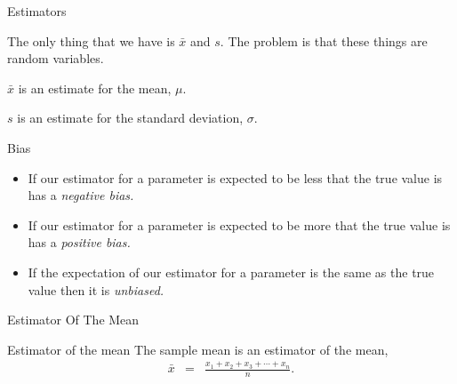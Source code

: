 \begin{frame}{Estimators}

  The only thing that we have is $\bar{x}$ and $s$. The problem is
  that these things are random variables.

  $\bar{x}$ is an estimate for the mean, $\mu$.

  $s$ is an estimate for the standard deviation, $\sigma$.

  \begin{definition}{Bias}
    \begin{itemize}
    \item If our estimator for a parameter is expected to be less that
      the true value is has a \textit{negative bias.}
    \item If our estimator for a parameter is expected to be more that
      the true value is has a \textit{positive bias.}
    \item If the expectation of our estimator for a parameter is the
      same as the true value then it is \textit{unbiased.}
    \end{itemize}
  \end{definition}
  
  \vfill

\end{frame}

\begin{frame}{Estimator Of The Mean}

  \begin{definition}{Estimator of the mean}
    The sample mean is an estimator of the mean,
  \begin{eqnarray*}
    \bar{x} & = & \frac{x_1 + x_2 + x_3 + \cdots + x_{n}}{n}.
  \end{eqnarray*}    
  \end{definition}
  
  \vfill
  \vfill
  \vfill

\end{frame}


